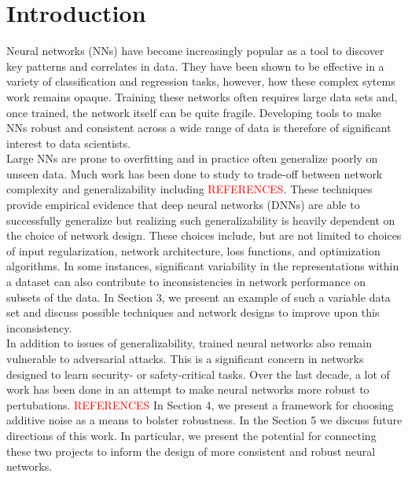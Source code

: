 \documentclass[12pt]{article}
\begin{document}
\section{Introduction}Neural networks (NNs) have become increasingly popular as a tool to discover key patterns and correlates in data. They have been shown to be effective in a variety of classification and regression tasks, however, how these complex sytems work remains opaque. Training these networks often requires large data sets and, once trained, the network itself can be quite fragile. Developing tools to make NNs robust and consistent across a wide range of data is therefore of significant interest to data scientists. \\
\indent Large NNs are prone to overfitting and in practice often generalize poorly on unseen data. Much work has been done to study to trade-off between network complexity and generalizability including \textcolor{red}{REFERENCES}. These techniques provide empirical evidence that deep neural networks (DNNs) are able to successfully generalize but realizing such generalizability is heavily dependent on the choice of network design. These choices include, but are not limited to choices of input regularization, network architecture, loss functions, and optimization algorithms. In some instances, significant variability in the representations within a dataset can also contribute to inconsistencies in network performance on subsets of the data. In Section 3, we present an example of such a variable data set and discuss possible techniques and network designs to improve upon this inconsistency. \\
\indent In addition to issues of generalizability, trained neural networks also remain vulnerable to adversarial attacks. This is a significant concern in networks designed to learn  security- or safety-critical tasks. Over the last decade, a lot of work has been done in an attempt to make neural networks more robust to pertubations. \textcolor{red}{REFERENCES} In Section 4, we present a framework for choosing additive noise as a means to bolster robustness. In the Section 5 we discuss future directions of this work. In particular, we present the potential for connecting these two projects to inform the design of more consistent and robust neural networks.
\end{document}

